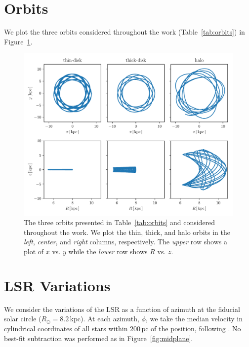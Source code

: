 \documentclass[twocolumn]{aastex62}
\newcommand{\pc}{\text{pc}}
\newcommand{\kpc}{\text{kpc}}
\begin{document}
\section{Orbits} \label{app:orbits}
We plot the three orbits considered throughout the work
(Table~\ref{tab:orbits}) in Figure~\ref{fig:plot_orbits}.

\begin{figure}
\begin{center}
\includegraphics[width=\textwidth]{fig/orbits.pdf}
\end{center}
\caption{The three orbits presented in Table~\ref{tab:orbits} and considered
throughout the work. We plot the thin, thick, and halo orbits in the {\em
left}, {\em center}, and {\em right} columns, respectively. The {\em upper}
row shows a plot of $x$ vs. $y$ while the {\em lower} row shows $R$ vs. $z$.}
\label{fig:plot_orbits}
\end{figure}

\section{LSR Variations} \label{app:lsr}
We consider the variations of the LSR as a function of azimuth at the fiducial
solar circle ($R_{\odot} = 8.2\,\kpc$). At each azimuth, $\phi$, we take the
median velocity in cylindrical coordinates of all stars within $200\,\pc$ of
the position, following \citet{2018arXiv180610564S}. No best-fit subtraction
was performed as in Figure~\ref{fig:midplane}.
\end{document}
